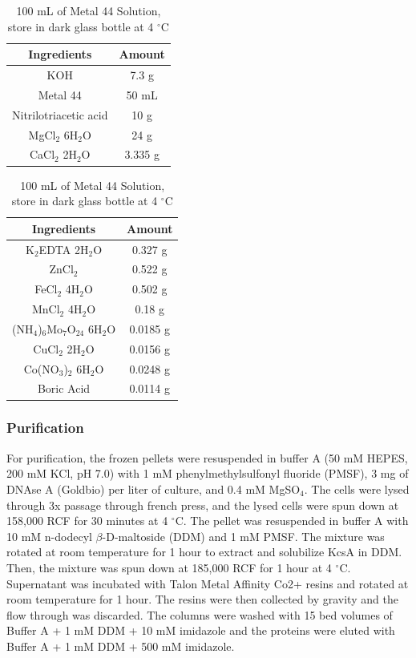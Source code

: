 \begin{table}[!htb]
    \begin{minipage}{.5\linewidth}
	  \caption{1 L of Solution C \\ adjust pH to 6.7}
      \centering
		\begin{tabular}{cc}
		\hline
		Ingredients & Amount \\
		\hline
		KOH & 7.3 g  \\
		Metal 44 & 50 mL \\
		Nitrilotriacetic acid & 10 g \\
		MgCl$_{2}$ 6H$_{2}$O & 24 g \\
		CaCl$_{2}$ 2H$_{2}$O & 3.335 g \\
		\hline
		\end{tabular}
		\label{table:ch3_t2}
    \end{minipage}
    \begin{minipage}{.5\linewidth}
		\caption{100 mL of Metal 44 Solution, \\store in dark glass bottle at 4 $^{\circ}$C}
		\centering
		  \begin{tabular}{cc}
	  	  \hline
		  Ingredients & Amount \\
 	      \hline
	      K$_{2}$EDTA 2H$_{2}$O  & 0.327 g  \\
          ZnCl$_{2}$ & 0.522 g \\
		  FeCl$_{2}$ 4H$_{2}$O & 0.502 g \\
		  MnCl$_{2}$ 4H$_{2}$O & 0.18 g \\	
		  (NH$_{4}$)$_{6}$Mo$_{7}$O$_{24}$ 6H$_{2}$O & 0.0185 g \\
		  CuCl$_{2}$ 2H$_{2}$O & 0.0156 g \\
		  Co(NO$_{3}$)$_{2}$ 6H$_{2}$O & 0.0248 g \\
		  Boric Acid & 0.0114 g \\
		  \hline
		  \end{tabular}
		  \label{table:ch3_t3}
    \end{minipage} 
\end{table}

\subsubsection{Purification}
For purification, the frozen pellets were resuspended in buffer A (50 mM HEPES, 200 mM KCl, pH 7.0) with 1 mM phenylmethylsulfonyl fluoride (PMSF), 3 mg of DNAse A (Goldbio) per liter of culture, and 0.4 mM MgSO$_{4}$. The cells were lysed through 3x passage through french press, and the lysed cells were spun down at 158,000 RCF for 30 minutes at 4 $^{\circ}$C. The pellet was resuspended in buffer A with 10 mM n-dodecyl $\beta$-D-maltoside (DDM) and 1 mM PMSF. The mixture was rotated at room temperature for 1 hour to extract and solubilize KcsA in DDM. Then, the mixture was spun down at 185,000 RCF for 1 hour at 4 $^{\circ}$C. Supernatant was incubated with Talon Metal Affinity Co2+ resins and rotated at room temperature for 1 hour. The resins were then collected by gravity and the flow through was discarded. The columns were washed with 15 bed volumes of Buffer A + 1 mM DDM + 10 mM imidazole and the proteins were eluted with Buffer A + 1 mM DDM + 500 mM imidazole.

